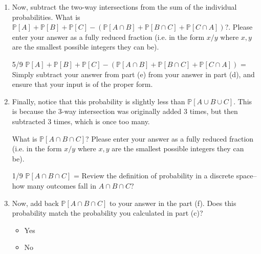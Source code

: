 \documentclass[11pt, preview]{standalone} %
\newcommand{\Prob}{\mathbb{P}}
\begin{document}
\begin{enumerate}
\begin{enumerate}
Now, calculate the sum of probabilities of the intersections, $\Prob[A \cap B] + \Prob[B \cap C] + \Prob[C \cap A]$. Please enter your answer as a fully reduced fraction (i.e. in the form $x/y$ where $x,y$ are the smallest possible integers they can be).
\begin{Freeform}{5/9}
$\Prob[A \cap B] + \Prob[B \cap C] + \Prob[C \cap A]$ = 
\Hint Review the definition of probability in a discrete space--how many outcomes fall in each of the two-way intersections of the events? Take a sum of each of the individual probabilities.
\end{Freeform}
\item Now, subtract the two-way intersections from the sum of the individual probabilities. What is $\Prob[A] + \Prob[B] + \Prob[C] - (\Prob[A \cap B] + \Prob[B \cap C] + \Prob[C \cap A])$?. Please enter your answer as a fully reduced fraction (i.e. in the form $x/y$ where $x,y$ are the smallest possible integers they can be).
\begin{Freeform}{5/9}
$\Prob[A] + \Prob[B] + \Prob[C] - (\Prob[A \cap B] + \Prob[B \cap C] + \Prob[C \cap A])$ = 
\Hint Simply subtract your answer from part (e) from your answer in part (d), and ensure that your input is of the proper form.
\end{Freeform}
\item Finally, notice that this probability is slightly less than $\Prob[A \cup B \cup C]$. This is because the 3-way intersection was originally added 3 times, but then subtracted 3 times, which is once too many. 

What is $\Prob[A \cap B \cap C]$? Please enter your answer as a fully reduced fraction (i.e. in the form $x/y$ where $x,y$ are the smallest possible integers they can be).
\begin{Freeform}{1/9}
$\Prob[A \cap B \cap C]$ = 
\Hint Review the definition of probability in a discrete space--how many outcomes fall in $A \cap B \cap C$?
\end{Freeform}
\item Now, add back $\Prob[A \cap B \cap C]$ to your answer in the part (f). Does this probability match the probability you calculated in part (c)?
\begin{Multi}
\begin{itemize}
\TrueChoice\item Yes
\FalseChoice\item No
\end{itemize}
\end{Multi}
\end{enumerate}


\end{enumerate}
\end{document}
